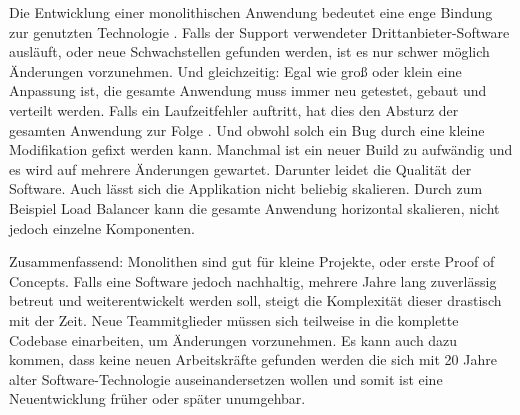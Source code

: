 Die Entwicklung einer monolithischen Anwendung bedeutet eine enge Bindung zur genutzten Technologie \cite{Ponce.2019}. Falls der Support verwendeter Drittanbieter-Software ausläuft, oder neue Schwachstellen gefunden werden, ist es nur schwer möglich Änderungen vorzunehmen. Und gleichzeitig: Egal wie groß oder klein eine Anpassung ist, die gesamte Anwendung muss immer neu getestet, gebaut und verteilt werden. Falls ein Laufzeitfehler auftritt, hat dies den Absturz der gesamten Anwendung zur Folge \cite{Ponce.2019}. Und obwohl solch ein Bug durch eine kleine Modifikation gefixt werden kann. Manchmal ist ein neuer Build zu aufwändig und es wird auf mehrere Änderungen gewartet. Darunter leidet die Qualität der Software. Auch lässt sich die Applikation nicht beliebig skalieren. Durch zum Beispiel Load Balancer kann die gesamte Anwendung horizontal skalieren, nicht jedoch einzelne Komponenten.

Zusammenfassend: Monolithen sind gut für kleine Projekte, oder erste Proof of Concepts. Falls eine Software jedoch nachhaltig, mehrere Jahre lang zuverlässig betreut und weiterentwickelt werden soll, steigt die Komplexität dieser drastisch mit der Zeit. Neue Teammitglieder müssen sich teilweise in die komplette Codebase einarbeiten, um Änderungen vorzunehmen. Es kann auch dazu kommen, dass keine neuen Arbeitskräfte gefunden werden die sich mit 20 Jahre alter Software-Technologie auseinandersetzen wollen und somit ist eine Neuentwicklung früher oder später unumgehbar. 

